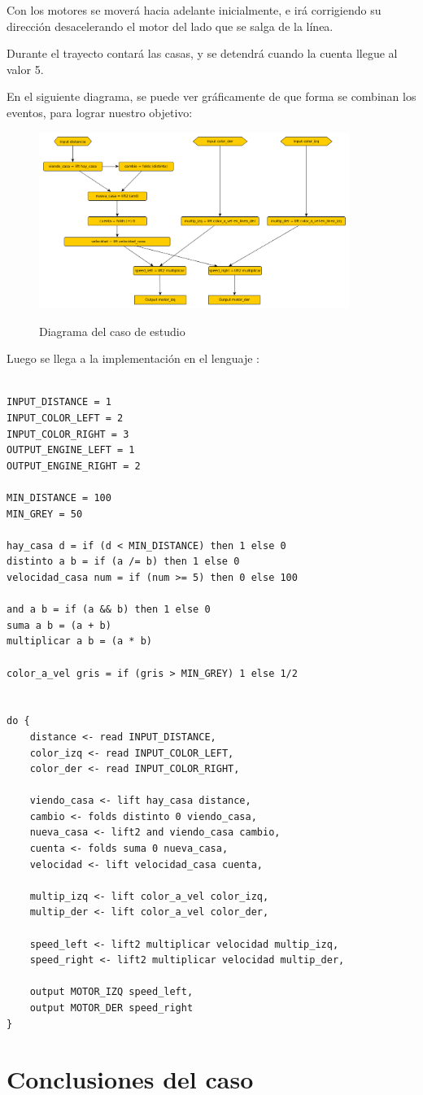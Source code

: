   Con los motores se moverá hacia adelante inicialmente, e irá corrigiendo
  su dirección desacelerando el motor del lado que se salga de la línea.

  Durante el trayecto contará las casas, y se detendrá cuando la cuenta
llegue al valor 5.

  En el siguiente diagrama, se puede ver gráficamente de que forma
se combinan los eventos, para lograr nuestro objetivo:

\begin{figure}[hbtp]
\begin{center}
\caption{Diagrama del caso de estudio}
\includegraphics[width=0.9\textwidth]{graphs/delivery.png}
\label{fig:delivery}
\end{center}
\end{figure}

  Luego se llega a la implementación en el lenguaje \frob :

\begin{verbatim}

INPUT_DISTANCE = 1
INPUT_COLOR_LEFT = 2
INPUT_COLOR_RIGHT = 3
OUTPUT_ENGINE_LEFT = 1
OUTPUT_ENGINE_RIGHT = 2

MIN_DISTANCE = 100
MIN_GREY = 50

hay_casa d = if (d < MIN_DISTANCE) then 1 else 0
distinto a b = if (a /= b) then 1 else 0
velocidad_casa num = if (num >= 5) then 0 else 100

and a b = if (a && b) then 1 else 0
suma a b = (a + b)
multiplicar a b = (a * b)

color_a_vel gris = if (gris > MIN_GREY) 1 else 1/2


do {
    distance <- read INPUT_DISTANCE,
    color_izq <- read INPUT_COLOR_LEFT,
    color_der <- read INPUT_COLOR_RIGHT,

    viendo_casa <- lift hay_casa distance,
    cambio <- folds distinto 0 viendo_casa,
    nueva_casa <- lift2 and viendo_casa cambio,
    cuenta <- folds suma 0 nueva_casa,
    velocidad <- lift velocidad_casa cuenta,

    multip_izq <- lift color_a_vel color_izq,
    multip_der <- lift color_a_vel color_der,

    speed_left <- lift2 multiplicar velocidad multip_izq,
    speed_right <- lift2 multiplicar velocidad multip_der,

    output MOTOR_IZQ speed_left,
    output MOTOR_DER speed_right
}

\end{verbatim}

\section {Conclusiones del caso}



